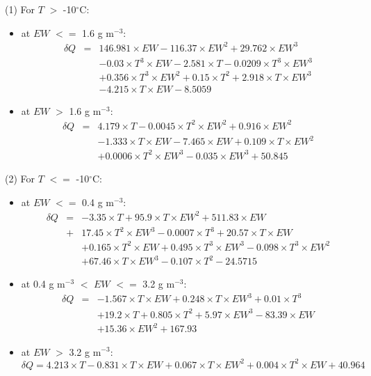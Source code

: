 \noindent
(1) For $T$ $>$ -10$^{\circ}$C:
\begin{itemize}
  \item at $EW$ $<=$ 1.6 g m$^{-3}$:
\begin{eqnarray}
 \delta Q & = & 146.981 \times EW - 116.37 \times EW^{2} + 29.762 \times EW^{3}  \nonumber \\
          &   & - 0.03 \times T^{3} \times EW - 2.581 \times T - 0.0209 \times T^{3} \times EW^{3} \nonumber \\
          &   & + 0.356 \times T^{3} \times EW^{2} + 0.15 \times T^{2} + 2.918 \times T \times EW^{3} \nonumber  \\ 
          &   & - 4.215 \times T \times EW - 8.5059 
\end{eqnarray}
  \item at $EW$ $>$ 1.6 g m$^{-3}$:
\begin{eqnarray}
 \delta Q & = & 4.179 \times T - 0.0045 \times T^{2} \times EW^{2} + 0.916 \times EW^{2} \nonumber \\
          &   & - 1.333 \times T \times EW - 7.465 \times EW + 0.109 \times T \times EW^{2} \nonumber \\
          &   & + 0.0006 \times T^{2} \times EW^{3} - 0.035 \times EW^{3} + 50.845
\end{eqnarray}
\end{itemize}

\noindent
(2) For $T$ $<=$ -10$^{\circ}$C:
\begin{itemize}
  \item at $EW$ $<=$ 0.4 g m$^{-3}$:
\begin{eqnarray}
 \delta Q & = & -3.35 \times T + 95.9 \times T \times EW^{2} + 511.83 \times EW \nonumber \\
          & + & 17.45 \times T^{2} \times EW^{3} - 0.0007 \times T^{3} + 20.57 \times T \times EW \nonumber \\
          &   & + 0.165 \times T^{2} \times EW + 0.495 \times T^{3} \times EW^{3} - 0.098 \times T^{3} \times EW^{2} \nonumber  \\
          &   & +67.46 \times T \times EW^{3} - 0.107 \times T^{2} - 24.5715
\end{eqnarray}
  \item at 0.4 g m$^{-3}$ $<$ $EW$ $<=$ 3.2 g m$^{-3}$:
\begin{eqnarray}
 \delta Q & = & -1.567 \times T \times EW + 0.248 \times T \times EW^{3} + 0.01 \times T^{3} \nonumber \\
          &   & + 19.2 \times T + 0.805 \times T^{2} + 5.97 \times EW^{3} - 83.39 \times EW \nonumber \\
          &   & + 15.36 \times EW^{2} + 167.93
\end{eqnarray}
  \item at $EW$ $>$ 3.2 g m$^{-3}$:
\begin{equation}
 \delta Q = 4.213 \times T - 0.831 \times T \times EW + 0.067 \times T \times EW^{2} + 0.004 \times T^{2} \times EW + 40.964
\end{equation}
\end{itemize}

